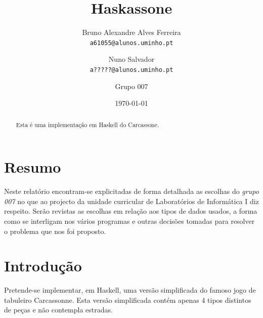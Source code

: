 \documentclass[11pt, a4paper, twoside]{article}
\begin{document}
\title{Haskassone}
\date{\today}
\author{
  Bruno Alexandre Alves Ferreira\\
  \texttt{a61055@alunos.uminho.pt}
  \and
  Nuno Salvador\\
  \texttt{a?????@alunos.uminho.pt}
  \and
  Grupo 007
}

\maketitle
\begin{abstract}
\begin{center}
  Esta é uma implementação em Haskell do Carcassone.
\end{center}
\end{abstract}
\newpage

\tableofcontents

\newpage
\section{Resumo}

Neste relatório encontram-se explicitadas de forma detalhada as escolhas do \textit{grupo 007} no que ao projecto da unidade curricular de Laboratórios de Informática I diz respeito. Serão revistas as escolhas em relação aos tipos de dados usados, a forma como se interligam nos vários programas e outras decisões tomadas para resolver o problema que nos foi proposto.

\newpage
\section{Introdução}

Pretende-se implementar, em Haskell, uma versão simplificada do famoso jogo de tabuleiro Carcassonne. Esta versão simplificada contém apenas 4 tipos distintos de peças e não contempla estradas.
\end{document}

